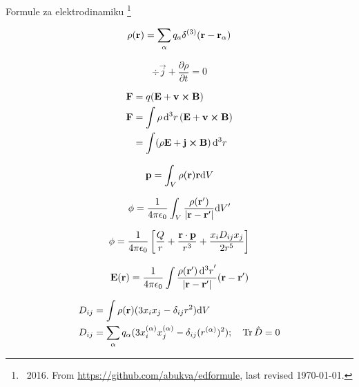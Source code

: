 \documentclass[11pt,twoside]{article}
\date{}
\begin{document}
\begin{center}
\LARGE
Formule za elektrodinamiku \footnote{ \textcopyleft \ 2016. From  \url{https://github.com/abukva/edformule}, last revised \today.}
\end{center}
\normalsize
\begin{multicols}{3}

\begin{footnotesize}

\begin{equation}
\rho(\vb{r}) = \sum_\alpha q_a \delta^{(3)}(\vb{r}-\vb{r_\alpha})
\end{equation}

\begin{equation}
\div\vec{j} + \frac{\partial \rho}{\partial t} = 0
\end{equation}

\begin{equation}
\begin{split}
\vb{F} &= q(\vb{E} + \vb{v}\cross\vb{B}) \\
\vb{F} &= \int \rho \dd[3]{r}(\vb{E} + \vb{v}\cross\vb{B}) \\
&= \int (\rho\vb{E} + \vb{j}\cross\vb{B})\dd[3]{r}
\end{split}
\end{equation}

\begin{equation}
\vb{p} = \int_V \rho(\vb{r}) \vb{r} \dd V
\end{equation}

\begin{equation}
\phi = \frac{1}{4 \pi \epsilon_0} \int_V \frac{\rho(\vb{r'})}{|\vb{r}-\vb{r'}|}\dd V'
\end{equation}

\begin{equation}
\phi = \frac{1}{4 \pi \epsilon_0} \left [\frac{Q}{r} + \frac{\vb{r}\cdot\vb{p}}{r^3} + \frac{x_i D_{ij}x_j}{2r^5} \right ]
\end{equation}

\begin{equation}
\vb{E}(\vb{r}) = \frac{1}{4 \pi \epsilon_0} \int \frac{\rho(\vb{r}')\dd[3]{r}'}{\abs{\vb{r}-\vb{r}'}}(\vb{r}-\vb{r}')
\end{equation}

\begin{equation}
\begin{split}
&D_{ij} = \int \rho(\vb{r})(3x_ix_j-\delta_{ij}r^2)\dd V \\
&D_{ij} = \sum_{\alpha} q_{\alpha} ( 3 x_i^{(\alpha)}x_j^{(\alpha)} - \delta_{ij}(r^{(\alpha)})^2); \quad \Tr\hat{D} =0
\end{split}
\end{equation}


\end{footnotesize}
\end{multicols}
\end{document}
